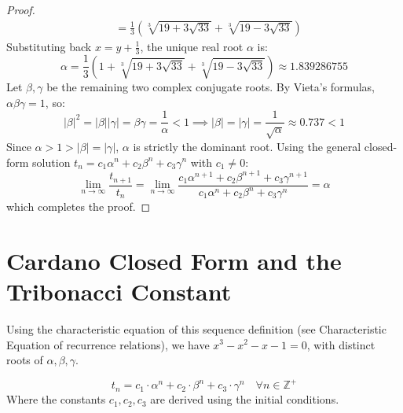 \documentclass[a4paper]{article}
\begin{document}
\begin{theorem}
\begin{proof}
\begin{align*}
  &= \frac{1}{3}\left(\sqrt[3]{19 + 3\sqrt{33}} + \sqrt[3]{19 - 3\sqrt{33}}\right)
\end{align*}
Substituting back $x = y + \frac{1}{3}$, the unique real root $\alpha$ is:
\begin{equation*}
\alpha = \frac{1}{3}\left(1 + \sqrt[3]{19 + 3\sqrt{33}} + \sqrt[3]{19 - 3\sqrt{33}}\right) \approx 1.839286755
\end{equation*}
Let $\beta, \gamma$ be the remaining two complex conjugate roots. By Vieta's formulas, $\alpha \beta \gamma = 1$, so:
\begin{equation*}
|\beta|^2 = |\beta||\gamma| = \beta \gamma = \frac{1}{\alpha} < 1 \implies |\beta| = |\gamma| = \frac{1}{\sqrt{\alpha}} \approx 0.737 < 1
\end{equation*}
Since $\alpha > 1 > |\beta| = |\gamma|$, $\alpha$ is strictly the dominant root. Using the general closed-form solution $t_n = c_1 \alpha^n + c_2 \beta^n + c_3 \gamma^n$ with $c_1 \neq 0$:
\begin{equation*}
\lim_{n \to \infty} \frac{t_{n+1}}{t_n} = \lim_{n \to \infty} \frac{c_1 \alpha^{n+1} + c_2 \beta^{n+1} + c_3 \gamma^{n+1}}{c_1 \alpha^n + c_2 \beta^n + c_3 \gamma^n} = \alpha
\end{equation*}
which completes the proof.
\end{proof}
\end{theorem}


\section{Cardano Closed Form and the Tribonacci Constant}\label{trib:sec:closed-form}
Using the characteristic equation of this sequence definition (see Characteristic Equation of recurrence relations),
we have $x^3 -x^2 -x -1 = 0$, with distinct roots of $\alpha, \beta, \gamma$.

\begin{theorem} \label{trib:Charac}
\[
t_{n} = c_1 \cdot \alpha^n + c_2 \cdot \beta^n + c_3 \cdot \gamma^n \quad
 \forall  n \in \mathbb{Z}^+
\]
Where the constants $c_{1}, c_{2}, c_{3}$ are derived using the initial conditions.
\end{theorem}
\end{document}
